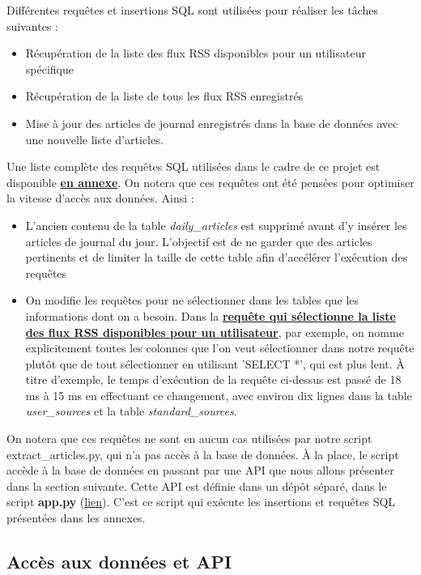 \documentclass[french]{article}
\begin{document}
    Différentes requêtes et insertions SQL sont utilisées pour réaliser les tâches suivantes :
    \begin{itemize}
        \item Récupération de la liste des flux RSS disponibles pour un utilisateur spécifique
        \item Récupération de la liste de tous les flux RSS enregistrés
        \item Mise à jour des articles de journal enregistrés dans la base de données avec une nouvelle liste d'articles.
    \end{itemize} 
    Une liste complète des requêtes SQL utilisées dans le cadre de ce projet est disponible \textbf{\hyperref[sec:sql]{en annexe}}.
    On notera que ces requêtes ont été pensées pour optimiser la vitesse d'accès aux données. Ainsi :
    \begin{itemize}
        \item L'ancien contenu de la table \textit{daily\_articles} est supprimé avant d'y insérer les articles de journal du jour. L'objectif est de ne garder que des articles pertinents et de limiter la taille de cette table afin d'accélérer l'exécution des requêtes
        \item On modifie les requêtes pour ne sélectionner dans les tables que les informations dont on a besoin. Dans la \textbf{\hyperref[sec:query]{requête qui sélectionne la liste des flux RSS disponibles pour un utilisateur}}, par exemple, on nomme explicitement toutes les colonnes que l'on veut sélectionner dans notre requête plutôt que de tout sélectionner en utilisant 'SELECT *', qui est plus lent. À titre d'exemple, le temps d'exécution de la requête ci-dessus est passé de 18 ms à 15 ms en effectuant ce changement, avec environ dix lignes dans la table \textit{user\_sources} et la table \textit{standard\_sources}.
    \end{itemize} 
    

    On notera que ces requêtes ne sont en aucun cas utilisées par notre script extract\_articles.py, qui n'a pas accès à la base de données. À la place, le script accède à la base de données en passant par une API que nous allons présenter dans la section suivante. Cette API est définie dans un dépôt séparé, dans le script \textbf{app.py} (\href{https://github.com/vinpap/your_news_anchor_db_api/blob/main/app.py}{lien}). C'est ce script qui exécute les insertions et requêtes SQL présentées dans les annexes.
    
    \subsection{Accès aux données et API}
    
\end{document}

